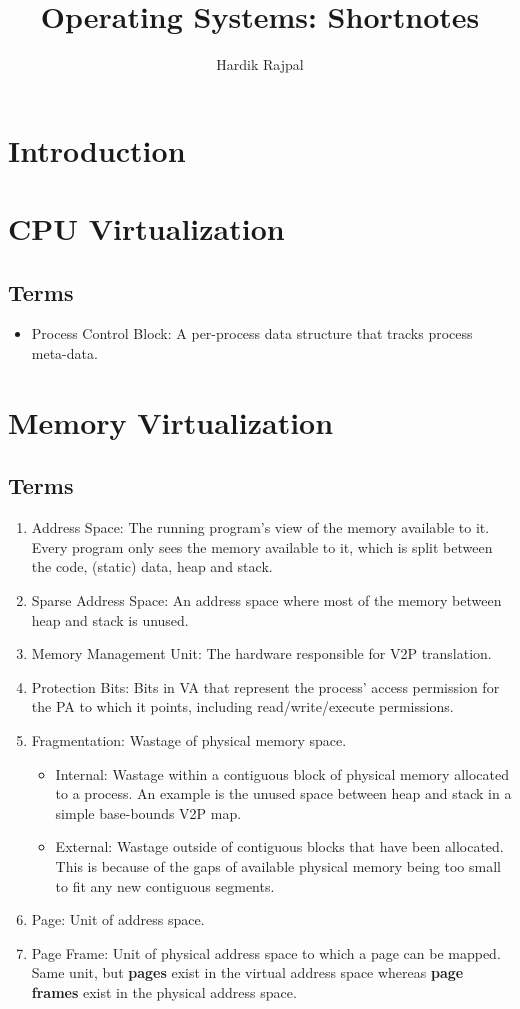 \documentclass[10pt]{report}
\title{Operating Systems: Shortnotes}
\author{Hardik Rajpal}
\begin{document}
\maketitle
\tableofcontents
\pagebreak
\chapter{Introduction}
\chapter{CPU Virtualization}
\section*{Terms}
\begin{itemize}
\item Process Control Block: A per-process data structure that tracks process meta-data.
\end{itemize}
\chapter{Memory Virtualization}
\section*{Terms}
\begin{enumerate}
    \item Address Space: The running program's view of the memory available to it. Every program only sees the memory available to it, which is split between the code, (static) data, heap and stack.
    \item Sparse Address Space: An address space where most of the
    memory between heap and stack is unused.
    \item Memory Management Unit: The hardware responsible for V2P translation.
    \item Protection Bits: Bits in VA that represent the process'
    access permission for the PA to which it points, including read/write/execute permissions. 
    \item Fragmentation: Wastage of physical memory space.
    \begin{itemize}
        \item Internal: Wastage within a contiguous block of physical memory allocated to a process. An example is the unused space between heap and stack in a simple base-bounds V2P map.
        \item External: Wastage outside of contiguous blocks that have been allocated. This is because of the gaps of available physical memory being too small to fit any new contiguous segments. 
    \end{itemize}
    \item Page: Unit of address space.
    \item Page Frame: Unit of physical address space to which a page can be mapped. Same unit, but \textbf{pages} exist in the
    virtual address space whereas \textbf{page frames} exist
    in the physical address space.
\end{enumerate}
\end{document}
